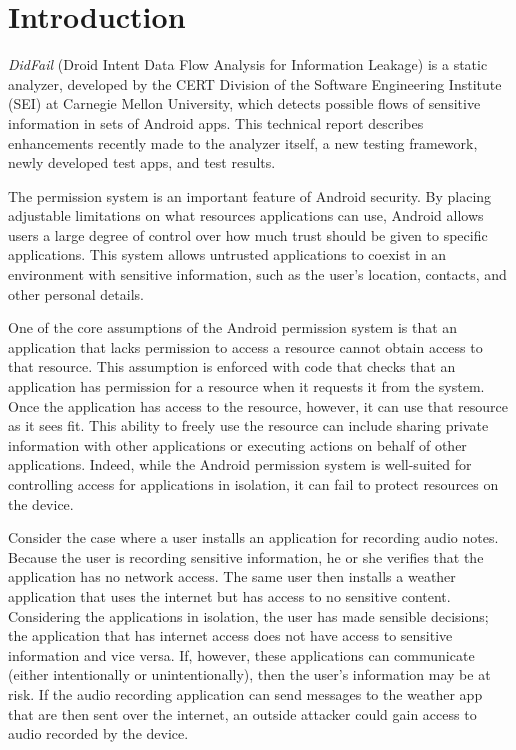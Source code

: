 \makeatletter
\patchcmd{\chapter}{\if@openright\cleardoublepage\else\clearpage\fi}{\vspace{1in}}{}{}
\makeatother

\nonfrenchspacing

\chapter{Introduction}
\label{sec:intro}
\textit{DidFail} (Droid Intent Data Flow Analysis for Information Leakage) is
a static analyzer, developed by the CERT Division of the Software Engineering Institute (SEI) at Carnegie Mellon University, which detects possible flows of sensitive
information in sets of Android apps. 
This technical report describes enhancements recently made to the analyzer
itself, a new testing framework, newly developed test apps, and test results. 

The permission system is an important feature of Android security. By placing adjustable limitations on what resources applications can use, Android allows users a large degree of control over how much trust should be given to specific applications. This system allows untrusted applications to coexist in an environment with sensitive information, such as the user's location, contacts, and other personal details.

One of the core assumptions of the Android permission system is that an application that lacks permission to access a resource cannot obtain access to that resource. This assumption is enforced with code that checks that an application has permission for a resource when it requests it from the system. Once the application has access to the resource, however, it can use that resource as it sees fit. This ability to freely use the resource can include sharing private information with other applications or executing actions on behalf of other applications. Indeed, while the Android permission system is well-suited for controlling access for applications in isolation, it can fail to protect resources on the device.

Consider the case where a user installs an application for recording audio notes. Because the user is recording sensitive information, he or she verifies that the application has no network access. The same user then installs a weather application that uses the internet but has access to no sensitive content. Considering the applications in isolation, the user has made sensible decisions; the application that has internet access does not have access to sensitive information and vice versa. If, however, these applications can communicate (either intentionally or unintentionally), then the user's information may be at risk. If the audio recording application can send messages to the weather app that are then sent over the internet, an outside attacker could gain access to audio recorded by the device.

